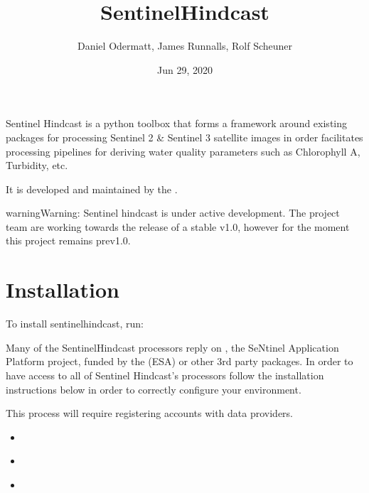 \documentclass[letterpaper,10pt,english]{sphinxmanual}
\title{Sentinel\sphinxhyphen{}Hindcast}
\date{Jun 29, 2020}
\author{Daniel Odermatt, James Runnalls, Rolf Scheuner}
\let\sphinxpxdimen\pdfpxdimen\else\newdimen\sphinxpxdimen
\begin{document}
\pagestyle{empty}
\sphinxmaketitle
\pagestyle{plain}
\sphinxtableofcontents
\pagestyle{normal}
\label{\detokenize{index::doc}}


\noindent{\sphinxincludegraphics[width=120\sphinxpxdimen]{{logo}.png}\hspace*{\fill}}

Sentinel Hindcast is a python toolbox that forms a framework around existing packages for processing
Sentinel 2 \& Sentinel 3 satellite images in order facilitates processing pipelines for deriving water
quality parameters such as Chlorophyll A, Turbidity, etc.

It is developed and maintained by the .

\begin{sphinxadmonition}{warning}{Warning:}
Sentinel hindcast is under active development. The project team are working towards
the release of a stable v1.0, however for the moment this project remains pre\sphinxhyphen{}v1.0.
\end{sphinxadmonition}


\chapter{Installation}
\label{\detokenize{index:installation}}
To install sentinel\sphinxhyphen{}hindcast, run:

\begin{sphinxVerbatim}[commandchars=\\\{\}]
  
   
\end{sphinxVerbatim}

Many of the Sentinel\sphinxhyphen{}Hindcast processors reply on  , the SeNtinel Application Platform
project, funded by the  (ESA) or other 3rd party packages. In order to have
access to all of Sentinel Hindcast’s processors follow the installation instructions below in order to
correctly configure your environment.

This process will require registering accounts with data providers.
\begin{itemize}
\item {} 
{\hyperref[\detokenize{ubuntu18_install:ubuntu18install}]{}}

\item {} 
{\hyperref[\detokenize{centos8_install:centos8install}]{}}

\item {} 
{\hyperref[\detokenize{windows10_install:windows10install}]{}}

\end{itemize}
\end{document}
